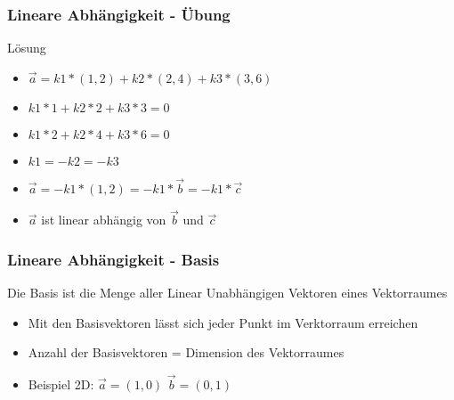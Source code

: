 \begin{frame}
    \frametitle{Lineare Abhängigkeit - Übung}
    Lösung
    \begin{itemize}
        \item $\vec{a} = k1 * (1, 2) + k2 * (2, 4) + k3 * (3, 6)$
        \item $k1 * 1 + k2 * 2 + k3 * 3 = 0$
        \item $k1 * 2 + k2 * 4 + k3 * 6 = 0$
        \item $k1 = -k2 = -k3$
        \item $\vec{a} = -k1 * (1, 2) = -k1 * \vec{b} = -k1 * \vec{c}$
        \item $\vec{a}$ ist linear abhängig von $\vec{b}$ und $\vec{c}$
    \end{itemize}
\end{frame}

\begin{frame}
    \frametitle{Lineare Abhängigkeit - Basis}
    Die Basis ist die Menge aller Linear Unabhängigen Vektoren eines Vektorraumes
    \begin{itemize}
        \item Mit den Basisvektoren lässt sich jeder Punkt im Verktorraum erreichen
        \item Anzahl der Basisvektoren = Dimension des Vektorraumes
        \item Beispiel 2D: $\vec{a} = (1, 0)$ $\vec{b} = (0, 1)$
        
    \end{itemize}
\end{frame}